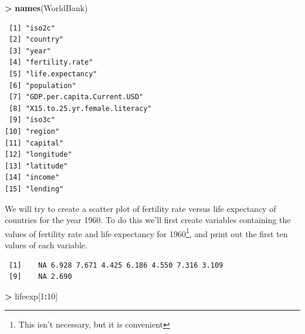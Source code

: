 \documentclass[
]{krantz}
\makeatletter
\newenvironment{Shaded}{\begin{snugshade}}{\end{snugshade}}
\newcommand{\DecValTok}[1]{\textcolor[rgb]{0.06,0.06,0.06}{#1}}
\newcommand{\KeywordTok}[1]{\textcolor[rgb]{0.27,0.27,0.27}{\textbf{#1}}}
\newcommand{\NormalTok}[1]{#1}
\newcommand{\OperatorTok}[1]{\textcolor[rgb]{0.43,0.43,0.43}{\textbf{#1}}}
\newcommand{\StringTok}[1]{\textcolor[rgb]{0.5,0.5,0.5}{#1}}
\newenvironment{kframe}{%
\medskip{}
\setlength{\fboxsep}{.8em}
 \def\at@end@of@kframe{}%
 \ifinner\ifhmode%
  \def\at@end@of@kframe{\end{minipage}}%
  \begin{minipage}{\columnwidth}%
 \fi\fi%
 \def\FrameCommand##1{\hskip\@totalleftmargin \hskip-\fboxsep
 \colorbox{shadecolor}{##1}\hskip-\fboxsep
     \hskip-\linewidth \hskip-\@totalleftmargin \hskip\columnwidth}%
 \MakeFramed {\advance\hsize-\width
   \@totalleftmargin\z@ \linewidth\hsize
   \@setminipage}}%
 {\par\unskip\endMakeFramed%
 \at@end@of@kframe}
\renewenvironment{Shaded}{\begin{kframe}}{\end{kframe}}
\makeatother
\begin{document}
\begin{Shaded}
\begin{Highlighting}[]
\OperatorTok{\textgreater{}}\StringTok{ }\KeywordTok{names}\NormalTok{(WorldBank)}
\end{Highlighting}
\end{Shaded}

\begin{verbatim}
 [1] "iso2c"                       
 [2] "country"                     
 [3] "year"                        
 [4] "fertility.rate"              
 [5] "life.expectancy"             
 [6] "population"                  
 [7] "GDP.per.capita.Current.USD"  
 [8] "X15.to.25.yr.female.literacy"
 [9] "iso3c"                       
[10] "region"                      
[11] "capital"                     
[12] "longitude"                   
[13] "latitude"                    
[14] "income"                      
[15] "lending"                     
\end{verbatim}

We will try to create a scatter plot of fertility rate versus life expectancy of countries for the year 1960. To do this we'll first create variables containing the values of fertility rate and life expectancy for 1960\footnote{This isn't necessary, but it is convenient}, and print out the first ten values of each variable.

\begin{Shaded}
\end{Shaded}

\begin{verbatim}
 [1]    NA 6.928 7.671 4.425 6.186 4.550 7.316 3.109
 [9]    NA 2.690
\end{verbatim}

\begin{Shaded}
\begin{Highlighting}[]
\OperatorTok{\textgreater{}}\StringTok{ }\NormalTok{lifeexp[}\DecValTok{1}\OperatorTok{:}\DecValTok{10}\NormalTok{]}
\end{Highlighting}
\end{Shaded}
\end{document}
